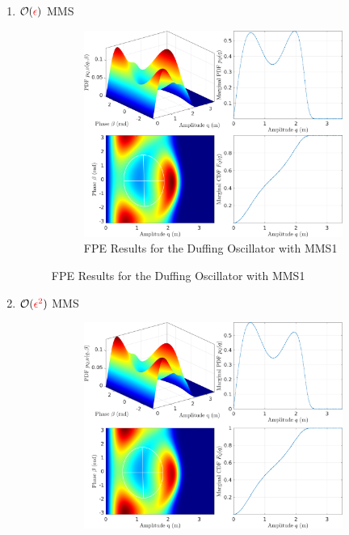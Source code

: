 \documentclass[11pt]{article}
\begin{document}
\begin{enumerate}
\item \(\mathcal{O}(\textcolor{red}{\epsilon})\) MMS
\label{sec:orgcc35ec9}
\begin{figure}
\begin{figure}[htbp]
\centering
\includegraphics[width=.9\linewidth]{FIGS/G3_SDOFFPE_duffing_mms1.png}
\caption{FPE Results for the Duffing Oscillator with MMS1}
\end{figure}
\end{figure}
\item \(\mathcal{O}(\textcolor{red}{\epsilon^2})\) MMS
\label{sec:orgef43544}
\begin{figure}
\begin{figure}[htbp]
\centering
\includegraphics[width=.9\linewidth]{FIGS/G3_SDOFFPE_duffing_mms2.png}

\end{figure}
\end{figure}
\end{enumerate}
\end{document}
